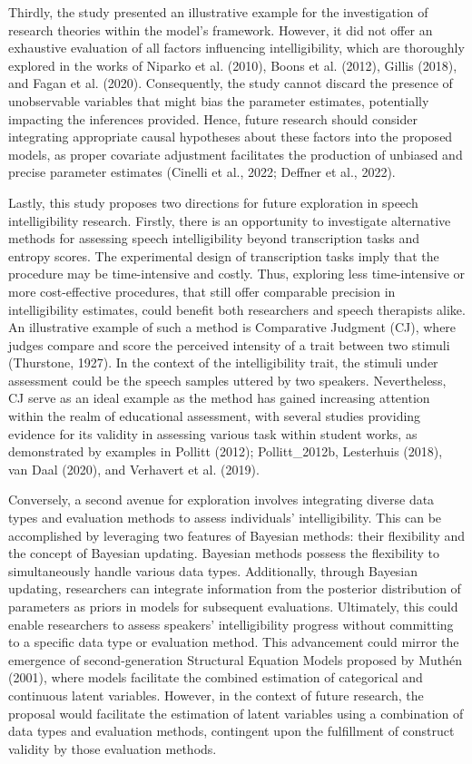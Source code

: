 \documentclass[
]{agujournal2019}
\begin{document}
Thirdly, the study presented an illustrative example for the
investigation of research theories within the model's framework.
However, it did not offer an exhaustive evaluation of all factors
influencing intelligibility, which are thoroughly explored in the works
of Niparko et al. (2010), Boons et al. (2012), Gillis (2018), and Fagan
et al. (2020). Consequently, the study cannot discard the presence of
unobservable variables that might bias the parameter estimates,
potentially impacting the inferences provided. Hence, future research
should consider integrating appropriate causal hypotheses about these
factors into the proposed models, as proper covariate adjustment
facilitates the production of unbiased and precise parameter estimates
(Cinelli et al., 2022; Deffner et al., 2022).

Lastly, this study proposes two directions for future exploration in
speech intelligibility research. Firstly, there is an opportunity to
investigate alternative methods for assessing speech intelligibility
beyond transcription tasks and entropy scores. The experimental design
of transcription tasks imply that the procedure may be time-intensive
and costly. Thus, exploring less time-intensive or more cost-effective
procedures, that still offer comparable precision in intelligibility
estimates, could benefit both researchers and speech therapists alike.
An illustrative example of such a method is Comparative Judgment (CJ),
where judges compare and score the perceived intensity of a trait
between two stimuli (Thurstone, 1927). In the context of the
intelligibility trait, the stimuli under assessment could be the speech
samples uttered by two speakers. Nevertheless, CJ serve as an ideal
example as the method has gained increasing attention within the realm
of educational assessment, with several studies providing evidence for
its validity in assessing various task within student works, as
demonstrated by examples in Pollitt (2012); Pollitt\_2012b, Lesterhuis
(2018), van Daal (2020), and Verhavert et al. (2019).

Conversely, a second avenue for exploration involves integrating diverse
data types and evaluation methods to assess individuals'
intelligibility. This can be accomplished by leveraging two features of
Bayesian methods: their flexibility and the concept of Bayesian
updating. Bayesian methods possess the flexibility to simultaneously
handle various data types. Additionally, through Bayesian updating,
researchers can integrate information from the posterior distribution of
parameters as priors in models for subsequent evaluations. Ultimately,
this could enable researchers to assess speakers' intelligibility
progress without committing to a specific data type or evaluation
method. This advancement could mirror the emergence of second-generation
Structural Equation Models proposed by Muthén (2001), where models
facilitate the combined estimation of categorical and continuous latent
variables. However, in the context of future research, the proposal
would facilitate the estimation of latent variables using a combination
of data types and evaluation methods, contingent upon the fulfillment of
construct validity by those evaluation methods.
\end{document}
